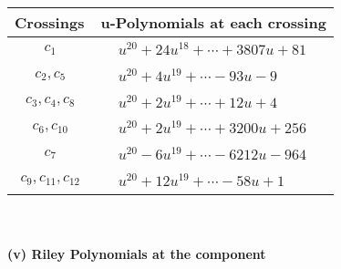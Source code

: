 \documentclass[1p]{elsarticle_modified}
\theoremstyle{definition}
\begin{document}
\begin{tabular}{m{50pt}|m{274pt}}
Crossings & \hspace{64pt}u-Polynomials at each crossing \\
\hline $$\begin{aligned}c_{1}\end{aligned}$$&$\begin{aligned}
&u^{20}+24 u^{18}+\cdots+3807 u+81
\end{aligned}$\\
\hline $$\begin{aligned}c_{2},c_{5}\end{aligned}$$&$\begin{aligned}
&u^{20}+4 u^{19}+\cdots-93 u-9
\end{aligned}$\\
\hline $$\begin{aligned}c_{3},c_{4},c_{8}\end{aligned}$$&$\begin{aligned}
&u^{20}+2 u^{19}+\cdots+12 u+4
\end{aligned}$\\
\hline $$\begin{aligned}c_{6},c_{10}\end{aligned}$$&$\begin{aligned}
&u^{20}+2 u^{19}+\cdots+3200 u+256
\end{aligned}$\\
\hline $$\begin{aligned}c_{7}\end{aligned}$$&$\begin{aligned}
&u^{20}-6 u^{19}+\cdots-6212 u-964
\end{aligned}$\\
\hline $$\begin{aligned}c_{9},c_{11},c_{12}\end{aligned}$$&$\begin{aligned}
&u^{20}+12 u^{19}+\cdots-58 u+1
\end{aligned}$\\
\hline
\end{tabular}\\~\\
\newpage\renewcommand{\arraystretch}{1}
\flushleft \textbf{(v) Riley Polynomials at the component}\newline \\
\end{document}
